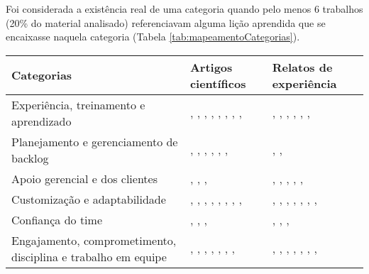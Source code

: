 		Foi considerada a existência real de uma categoria quando pelo menos 6 trabalhos (20\% do material analisado) referenciavam alguma lição aprendida que se encaixasse naquela categoria (Tabela \ref{tab:mapeamentoCategorias}).
		\begin{table}[H]
		\centering
		\begin{tabularx}{\linewidth}{ | p{6cm} | X | X | }
		\hline 
		\textbf{Categorias} & \textbf{Artigos científicos} & \textbf{Relatos de experiência} \\ 
		\hline 
		Experiência, treinamento e aprendizado & \cite{Hajjdiab2011}, \cite{Block2011}, \cite{Adobe2012}, \cite{Cisco2011}, \cite{Lapham2012}, \cite{Eunha2012}, \cite{Claudia2013}, \cite{Asnawi2012}, \cite{Fitzgerald2013} & \cite{Stefano2013}, \cite{Rodrigues2013}, \cite{Bastos2013}, \cite{Maciel2013}, \cite{Karaj2013}, \cite{Piegas2012}, \cite{Vieira2013} \\ 
		\hline 
		Planejamento e gerenciamento de backlog & \cite{Hajjdiab2011}, \cite{Fitzgerald2013}, \cite{Block2011}, \cite{Adobe2012}, \cite{Bustard2013}, \cite{Korhonen2010}, \cite{Claudia2013} & \cite{Piegas2012}, \cite{Hui2013}, \cite{Parzinello2012} \\ 
		\hline 
		Apoio gerencial e dos clientes & \cite{Hajjdiab2011}, \cite{Cisco2011}, \cite{Claudia2013}, \cite{Arikpo2011} & \cite{Parzinello2012}, \cite{Stefano2013}, \cite{Bastos2013}, \cite{Maciel2013}, \cite{Srinath2012}, \cite{Piegas2012} \\ 
		\hline 
		Customização e adaptabilidade & \cite{Hajjdiab2011}, \cite{Block2011}, \cite{Asnawi2012}, \cite{Fitzgerald2013}, \cite{Bustard2013}, \cite{Microsoft2013}, \cite{Lapham2012}, \cite{Claudia2013}, \cite{Nokia2013} & \cite{Piegas2012}, \cite{Hui2013}, \cite{Rodrigues2013}, \cite{Bastos2013}, \cite{Maciel2013}, \cite{Ahmed2008}, \cite{Sahota2012}, \cite{Vieira2013} \\ 
		\hline 
		Confiança do time & \cite{Block2011}, \cite{Asnawi2012}, \cite{Claudia2013}, \cite{Nokia2013} & \cite{Parzinello2012}, \cite{Ahmed2008}, \cite{Piegas2012}, \cite{Bastos2013} \\ 
		\hline 
		Engajamento, comprometimento, disciplina e trabalho em equipe & \cite{Block2011}, \cite{Asnawi2012}, \cite{Lapham2012}, \cite{Microsoft2013}, \cite{Claudia2013}, \cite{Nokia2013}, \cite{Adobe2012}, \cite{Fitzgerald2013} & \cite{Piegas2012}, \cite{Parzinello2012}, \cite{Stefano2013}, \cite{Rodrigues2013}, \cite{Maciel2013}, \cite{Queiroz2013}, \cite{Bastos2013}, \cite{Ahmed2008} \\ 

\end{tabularx}
\end{table}
